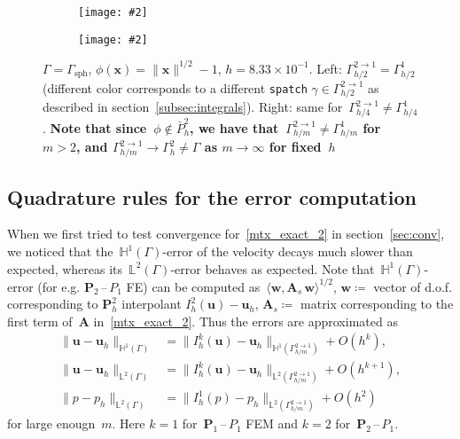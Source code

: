 \documentclass[12pt]{article}
\newcommand{\includegraphicsw}[2][1.]{\texttt{[image: \#2]}}
\newcommand{\vect}[1]{\boldsymbol{\mathbf{#1}}}
\newcommand{\sphere}{{\Gamma_{\text{sph}}}}
\newcommand{\LTwoSpace}[1][\Gamma]{{\mathbb L^2\left({#1}\right)}}
\newcommand{\HOneSpace}[1][\Gamma]{{\mathbb H^1\left({#1}\right)}}
\begin{document}
\begin{figure}[h!]
	\centering
	\begin{subfigure}{.5\linewidth}
		\centering
		\includegraphicsw[.6]{patches_2_inexact.png}
	\end{subfigure}%
	\begin{subfigure}{.5\linewidth}
		\centering
		\includegraphicsw[.6]{patches_4_inexact.png}
	\end{subfigure}%
	\par\bigskip
	\caption{$\Gamma = \sphere$, $\phi(\vect x) = \|\vect x\|^{1/2} - 1$, $h = 8.33\times10^{-1}$. Left: $\Gamma_{h/2}^{2 \rightarrow 1} = \Gamma_{h/2}^1$ (different color corresponds to a different \texttt{spatch} $\gamma \in \Gamma_{h/2}^{2 \rightarrow 1}$ as described in section~\ref{subsec:integrals}). Right: same for~$\Gamma_{h/4}^{2 \rightarrow 1} \ne \Gamma_{h/4}^1$. \textbf{Note that since~$\phi \not\in \bar{P}^2_h$, we have that~$\Gamma_{h/m}^{2 \rightarrow 1} \ne \Gamma_{h/m}^1$ for~$m > 2$, and $\Gamma_{h/m}^{2 \rightarrow 1} \rightarrow \Gamma_h^2 \ne \Gamma$ as $m \rightarrow \infty$ for fixed~$h$}}
	\label{fig:phi_inexact}		
\end{figure}
\clearpage

\subsection{Quadrature rules for the error computation}\label{subsec:err}

When we first tried to test convergence for~\eqref{mtx_exact_2} in section~\ref{sec:conv}, we noticed that the~$\HOneSpace$-error of the velocity decays much slower than expected, whereas its~$\LTwoSpace$-error behaves as expected. Note that~$\HOneSpace$-error (for e.g. $\vect P_2$\,--\,$P_1$ FE) can be computed as~$\langle \vect w, \vect A_s\,\vect w \rangle^{1/2}$, $\vect w \coloneqq$ vector of d.o.f. corresponding to $\vect P^2_h$ interpolant $I_h^2(\vect u) - \vect u_h$, $\vect A_s \coloneqq$ matrix corresponding to the first term of~$\vect A$ in~\eqref{mtx_exact_2}. Thus the errors are approximated as
\begin{align*}
	\| \vect u - \vect u_h \|_{\HOneSpace} &= \| I^k_h(\vect u) - \vect u_h \|_{\HOneSpace[\Gamma_{h/m}^{2 \to 1}]} + O(h^{k}), \\
	\| \vect u - \vect u_h \|_{\LTwoSpace} &= \| I^k_h(\vect u) - \vect u_h \|_{\LTwoSpace[\Gamma_{h/m}^{2 \to 1}]} + O(h^{k+1}), \\
	\| p - p_h \|_{\LTwoSpace} &= \| I^1_h(p) - p_h \|_{\LTwoSpace[\Gamma_{h/m}^{2 \to 1}]} + O(h^2)
\end{align*}
for large enougn~$m$. Here $k = 1$ for~$\vect P_1$\,--\,$P_1$ FEM and $k = 2$ for~$\vect P_2$\,--\,$P_1$.
\end{document}
